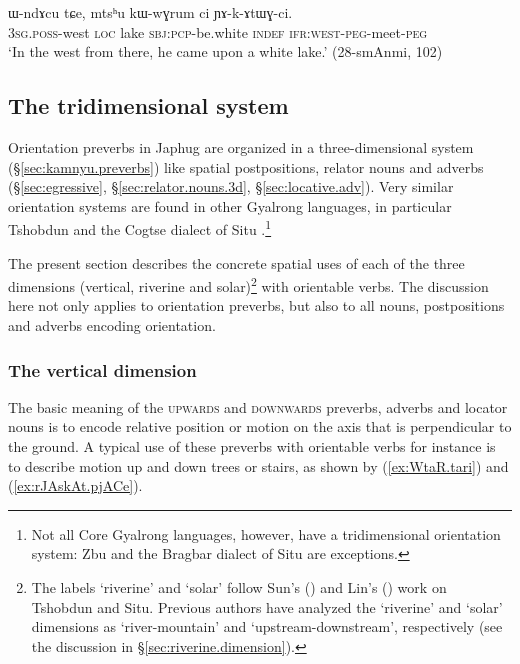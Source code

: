 \begin{exe}
	\ex \label{ex:WndAcu.YAkAtWGci}
	\gll ɯ-ndɤcu tɕe, mtsʰu kɯ-wɣrum ci ɲɤ-k-ɤtɯɣ-ci. \\
	\textsc{3sg}.\textsc{poss}-west \textsc{loc} lake \textsc{sbj}:\textsc{pcp}-be.white \textsc{indef} \textsc{ifr}:\textsc{west}-\textsc{peg}-meet-\textsc{peg} \\
	\glt `In the west from there, he came upon a white lake.' (28-smAnmi, 102)
\end{exe}

 
\subsection{The tridimensional system} \label{sec:tridimensional.preverb}
Orientation preverbs in Japhug are organized in a three-dimensional system (§\ref{sec:kamnyu.preverbs}) like spatial postpositions, relator nouns and adverbs (§\ref{sec:egressive}, §\ref{sec:relator.nouns.3d}, §\ref{sec:locative.adv}). Very similar orientation systems are found in other Gyalrong languages, in particular Tshobdun \citep{jackson00sidaba} and the Cogtse dialect of Situ \citep{linxr93jiarong, lin02dimension, linyj17space}.\footnote{Not all Core Gyalrong languages, however, have a tridimensional orientation system: Zbu \citep{gong18these} and the Bragbar dialect of Situ \citep{zhangshuya20these} are exceptions.} 

The present section describes the concrete spatial uses of each of the three dimensions (vertical, riverine and solar)\footnote{The labels `riverine' and `solar' follow  Sun's (\citeyear{jackson00sidaba}) and Lin's (\citeyear{lin02dimension}) work on Tshobdun and Situ. Previous authors \citep{linxr93jiarong} have analyzed the `riverine' and `solar' dimensions as `river-mountain' and `upstream-downstream', respectively (see the discussion in §\ref{sec:riverine.dimension}).  } with orientable verbs. The discussion here not only applies to orientation preverbs, but also to all nouns, postpositions and adverbs encoding orientation.

 
\subsubsection{The vertical dimension}  \label{sec:vertical.dimension}
The basic meaning of the \textsc{upwards}  and \textsc{downwards} preverbs, adverbs and locator nouns is to encode relative position or motion on the axis that is perpendicular to the ground. A typical use of these preverbs with orientable verbs for instance is to describe motion up and down trees or stairs, as shown by (\ref{ex:WtaR.tari}) and (\ref{ex:rJAskAt.pjACe}).

